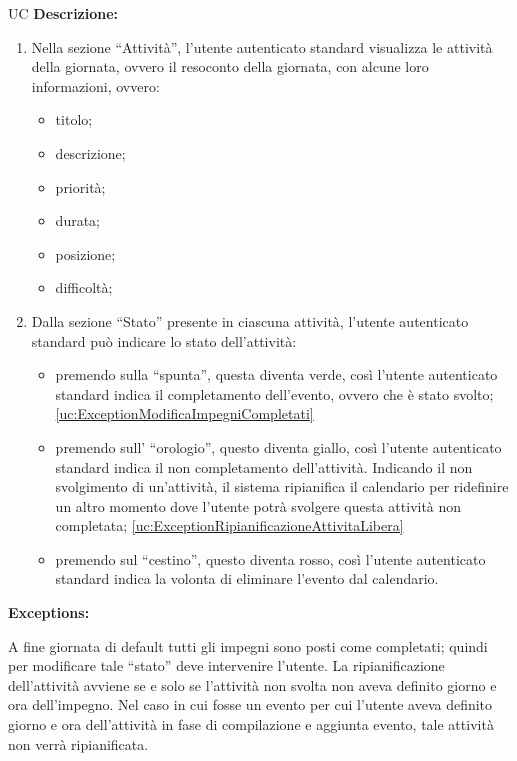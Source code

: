 \begin{listaPersonale}{UC}
    \textbf{Descrizione:}
    \begin{enumerate}
        \item Nella sezione “Attività”, l'utente autenticato standard visualizza le attività della giornata, ovvero il resoconto della giornata, con alcune loro informazioni, ovvero:
              \begin{itemize}
                  \item titolo;
                  \item descrizione;
                  \item priorità;
                  \item durata;
                  \item posizione;
                  \item difficoltà;
              \end{itemize}
        \item Dalla sezione “Stato” presente in ciascuna attività, l'utente autenticato standard può indicare lo stato dell'attività:
              \begin{itemize}
                  \item premendo sulla “spunta”, questa diventa verde, così l'utente autenticato standard indica il completamento dell'evento, ovvero che è stato svolto; \ref{uc:ExceptionModificaImpegniCompletati}
                  \item premendo sull' “orologio”, questo diventa giallo, così l'utente autenticato standard indica il non completamento dell'attività. Indicando il non svolgimento di un'attività, il sistema ripianifica il calendario per ridefinire un altro momento dove l'utente potrà svolgere questa attività non completata; \ref{uc:ExceptionRipianificazioneAttivitaLibera}
                  \item premendo sul “cestino”, questo diventa rosso, così l'utente autenticato standard indica la volonta di eliminare l'evento dal calendario.
              \end{itemize}

    \end{enumerate}



    \textbf{Exceptions:}
    \begin{enumerate}[label=\textbf{[exception \arabic{enumii}]}, ref= \textbf{[exception \arabic{enumii}]}]
         A fine giornata di default tutti gli impegni sono posti come completati; quindi per modificare tale “stato” deve intervenire l'utente.
         La ripianificazione dell'attività avviene se e solo se l'attività non svolta non aveva definito giorno e ora dell'impegno. Nel caso in cui fosse un evento per cui l'utente aveva definito giorno e ora dell'attività in fase di compilazione e aggiunta evento, tale attività non verrà ripianificata.
    \end{enumerate}







\end{listaPersonale}
